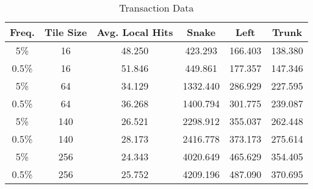 \begin{table}
	\begin{center}
		\begin{tabular}{|c|c|c|c|c|c|}
			\hline
			Freq. & Tile Size & Avg. Local Hits & Snake & Left & Trunk \\
			\hline
			5\% & 16 & 48.250 & 423.293 & 166.403 & 138.380 \\
			\hline
			0.5\% & 16 & 51.846 & 449.861 & 177.357 & 147.346 \\
			\hline
			5\% & 64 & 34.129 & 1332.440 & 286.929 & 227.595 \\
			\hline
			0.5\% & 64 & 36.268 & 1400.794 & 301.775 & 239.087 \\
			\hline
			5\% & 140 & 26.521 & 2298.912 & 355.037 & 262.448 \\
			\hline
			0.5\% & 140 & 28.173 & 2416.778 & 373.173 & 275.614 \\
			\hline
			5\% & 256 & 24.343 & 4020.649 & 465.629 & 354.405 \\
			\hline
			0.5\% & 256 & 25.752 & 4209.196 & 487.090 & 370.695 \\
			\hline
		\end{tabular}
	\end{center}
	\caption{Transaction Data}
	\label{tab:transact}
\end{table}